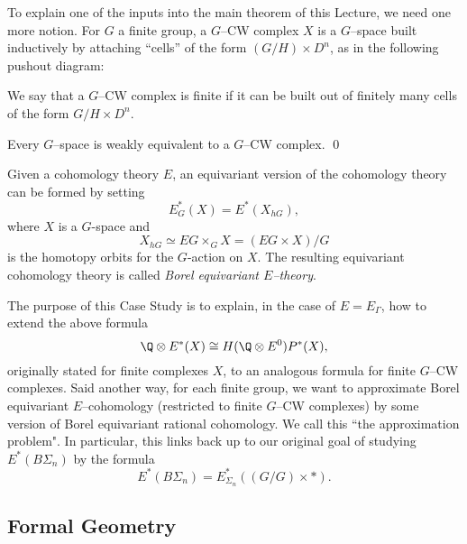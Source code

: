 To explain one of the inputs into the main theorem of this Lecture, we need one more notion. For \(G\) a finite group, a \(G\)--CW complex \(X\) is a \(G\)--space built inductively by attaching ``cells'' of the form \((G/H) \times D^n\), as in the following pushout diagram:
\begin{center}
\end{center}
We say that a \(G\)--CW complex is finite if it can be built out of finitely many cells of the form \(G/H \times D^n\).

\begin{theorem} \label{app:CWapprox}
Every \(G\)--space is weakly equivalent to a \(G\)--CW complex. \qed
\end{theorem}

Given a cohomology theory \(E\), an equivariant version of the cohomology theory can be formed by setting
\[
E^{*}_{G}(X) = E^*(X_{hG}),
\]
where \(X\) is a \(G\)-space and
\[
X_{hG} \simeq EG \times_G X = (EG \times X)/G
\]
is the homotopy orbits for the \(G\)-action on \(X\). The resulting equivariant cohomology theory is called \textit{Borel equivariant \(E\)--theory}.

The purpose of this Case Study is to explain, in the case of \(E = E_{\Gamma}\), how to extend the above formula \[\Q \otimes E^*(X) \cong H(\Q \otimes E^0)P^*(X),\] originally stated for finite complexes \(X\), to an analogous formula for finite \(G\)--CW complexes. Said another way, for each finite group, we want to approximate Borel equivariant \(E\)--cohomology (restricted to finite \(G\)--CW complexes) by some version of Borel equivariant rational cohomology. We call this ``the approximation problem".  In particular, this links back up to our original goal of studying \(E^*(B\Sigma_n)\) by the formula \[E^*(B\Sigma_n) = E_{\Sigma_n}^*((G/G) \times *).\]

\subsection*{Formal Geometry}


